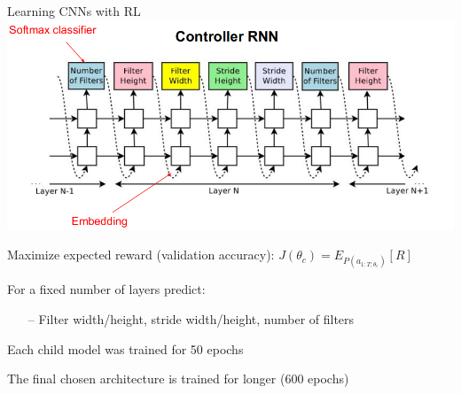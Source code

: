 \begin{frame}[c]{Learning CNNs with RL }
\centering
\includegraphics[width=.8\textwidth]{images_lec7/RL_CNN_controller}

\begin{itemize}
\footnotesize{
	\item Maximize expected reward (validation accuracy): 
	$J(\theta_c)=E_{P(a_{1:T; \theta_c})}[R]$
	\item For a fixed number of layers predict:
	\begin{itemize}
		\item[--] Filter width/height, stride width/height, number of filters	
	\end{itemize}
	\item Each child model was trained for 50 epochs
	\item The final chosen architecture is trained for longer (600 epochs)
	
}
\end{itemize}
\end{frame}
